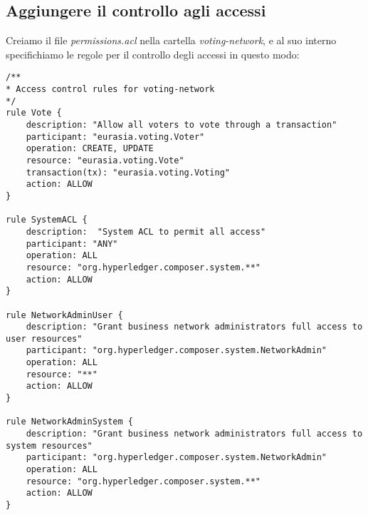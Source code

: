 	\subsection{Aggiungere il controllo agli accessi}
		Creiamo il file \emph{permissions.acl} nella cartella \emph{voting-network}, e al suo interno specifichiamo le regole per il controllo degli accessi in questo modo:
\begin{lstlisting}
/**
* Access control rules for voting-network
*/
rule Vote {
	description: "Allow all voters to vote through a transaction"
	participant: "eurasia.voting.Voter"
	operation: CREATE, UPDATE
	resource: "eurasia.voting.Vote"
	transaction(tx): "eurasia.voting.Voting"
	action: ALLOW
}

rule SystemACL {
	description:  "System ACL to permit all access"
	participant: "ANY"
	operation: ALL
	resource: "org.hyperledger.composer.system.**"
	action: ALLOW
}

rule NetworkAdminUser {
	description: "Grant business network administrators full access to user resources"
	participant: "org.hyperledger.composer.system.NetworkAdmin"
	operation: ALL
	resource: "**"
	action: ALLOW
}

rule NetworkAdminSystem {
	description: "Grant business network administrators full access to system resources"
	participant: "org.hyperledger.composer.system.NetworkAdmin"
	operation: ALL
	resource: "org.hyperledger.composer.system.**"
	action: ALLOW
}
\end{lstlisting}